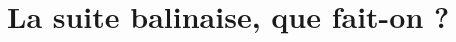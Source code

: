 \documentclass[a5paper, 10pt]{book}
\begin{document}
%

%

\chapter{La suite balinaise, que fait-on ?}


\backmatter
\end{document}
